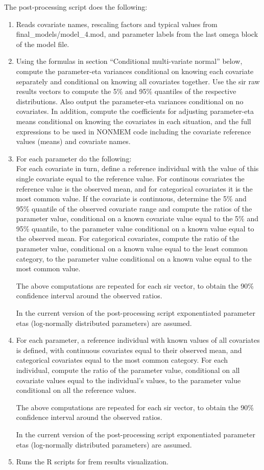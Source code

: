 The post-processing script does the following:
\begin{enumerate}
\item Reads covariate names, rescaling factors and typical values from final\_models/model\_4.mod,
and parameter labels from the last omega block of the model file.
\item Using the formulas in section ``Conditional multi-variate normal'' below,
compute the parameter-eta variances conditional on knowing
each covariate separately and conditional on knowing all covariates together.
Use the sir raw results vectors to compute the 5\% and 95\% quantiles of the respective distributions.
Also output the parameter-eta variances conditional on no covariates.
In addition, compute the coefficients for adjusting parameter-eta means
conditional on knowing the covariates in each situation, and the full expressions to be used in NONMEM code
including the covariate reference values (means) and covariate names.

\item For each parameter do the following:\\
For each covariate in turn, define a reference individual with the value of this single covariate equal to
the reference value. For continous covariates the reference value is the observed mean, and for categorical covariates
it is the most common value.
If the covariate is continuous, determine the 5\% and 95\% quantile of the observed covariate range
and compute the ratios of the parameter value, conditional on a known covariate value equal to the 5\% and 95\% quantile,
to the parameter value conditional on a known value equal to the observed mean.
For categorical covariates, compute the ratio of the parameter value, conditional on a known value equal to the least
common category, to the parameter value conditional on a known value equal to the most common value.

The above computations are repeated for each sir vector, to obtain the 90\% confidence interval around the observed
ratios.

In the current version of the post-processing script exponentiated parameter etas (log-normally distributed parameters)
are assumed.
\item For each parameter,
a reference individual with known values of all covariates is defined, with continuous covariates equal
to their observed mean, and categorical covariates equal to the most common category.
For each individual, compute the ratio of the parameter value, conditional on all covariate values equal to the individual's
values, to the parameter value conditional on all the reference values.

The above computations are repeated for each sir vector, to obtain the 90\% confidence interval around the observed
ratios.

In the current version of the post-processing script exponentiated parameter etas (log-normally distributed parameters)
are assumed.
\item Runs the R scripts for frem results visualization.
\end{enumerate}

